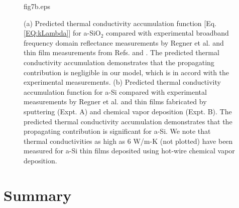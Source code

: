 \documentclass[aps,prb,onecolumn,preprint,superscriptaddress,footinbib,amsmath,amssymb,floatfix]{revtex4}
\begin{document}
\begin{figure}
\begin{center}
{fig7b.eps}
\vspace*{-5mm}
\end{center}
\caption{\label{FIG:sio2_accum} 
{\scriptsize
(a) Predicted thermal conductivity 
accumulation function [Eq. \eqref{EQ:kLambda}]  
for a-SiO$_2$ compared with experimental broadband frequency 
domain reflectance measurements 
by Regner et al.\cite{regner_broadband_2013} and thin film 
measurements from Refs.  and 
. 
The predicted thermal conductivity accumulation demonstrates that 
the propagating contribution is negligible in our model, which is 
in accord with the experimental measurements. 
(b) Predicted thermal conductivity 
accumulation function 
for a-Si compared with experimental measurements 
by Regner et al. and thin films fabricated by    
sputtering (Expt. A)
\cite{kuo_thermal_1992,wada_thermal_1996,cahill_thermal_1994} 
and chemical vapor deposition (Expt. B).
\cite{hasselman_thermal_1989,moon_thermal_2002,liu_high_2009,
yang_anomalously_2010} 
The predicted thermal conductivity accumulation demonstrates that 
the propagating contribution is significant for a-Si. 
We note that thermal conductivities as high as 6 W/m-K (not plotted) 
have been measured for a-Si thin films deposited using 
hot-wire chemical vapor deposition.
\cite{yang_anomalously_2010}}}
\end{figure}


\clearpage

\section{\label{S:Lifetimes}Summary}
\end{document}
